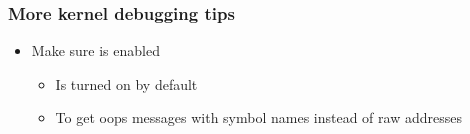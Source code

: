 \begin{frame}
  \frametitle{More kernel debugging tips}
  \begin{itemize}
  \item Make sure  is enabled
    \begin{itemize}
    \item Is turned on by default
    \item To get oops messages with symbol names instead of raw addresses
    \end{itemize}
  \end{itemize}
\end{frame}
